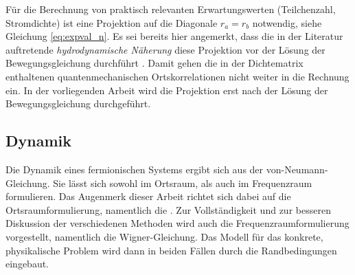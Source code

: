 Für die Berechnung von praktisch relevanten Erwartungswerten (Teilchenzahl, Stromdichte) ist eine Projektion auf die Diagonale $r_a=r_b$ notwendig, siehe Gleichung \eqref{eq:expval_n}. Es sei bereits hier angemerkt, dass die in der Literatur auftretende  \emph{hydrodynamische Näherung} diese Projektion vor der Lösung der Bewegungsgleichung durchführt \cite{wiedenhaus}. Damit gehen die in der Dichtematrix enthaltenen quantenmechanischen Ortskorrelationen nicht weiter in die Rechnung ein. In der vorliegenden Arbeit wird die Projektion erst nach der Lösung der Bewegungsgleichung durchgeführt.

\subsection{Dynamik}
Die Dynamik eines fermionischen Systems ergibt sich aus der von-Neumann-Gleichung. Sie lässt sich sowohl im Ortsraum, als auch im Frequenzraum formulieren. Das Augenmerk dieser Arbeit richtet sich dabei auf die Ortsraumformulierung, namentlich die \lvn. Zur Vollständigkeit und zur besseren Diskussion der verschiedenen Methoden wird auch die Frequenzraumformulierung vorgestellt, namentlich die Wigner-Gleichung. Das Modell für das konkrete, physikalische Problem wird dann in beiden Fällen durch die Randbedingungen eingebaut.

